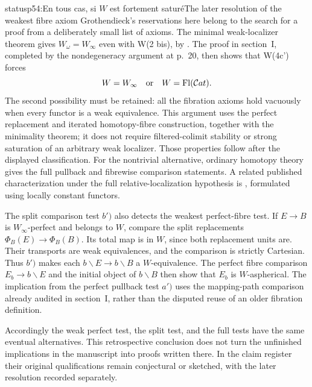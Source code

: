 \begin{dcomment}{status}{p54:En tous cas, si $W$ est fortement saturé}{The later resolution of the weakest fibre axiom}
Grothendieck's reservations here belong to the search for a proof from a deliberately small list of axioms. The minimal weak-localizer theorem gives $W_\omega=W_\infty$ even with W(2 bis), by \citet[Theorem~6.1.18]{Cisinski2006}. The proof in section~I, completed by the nondegeneracy argument at p.~20, then shows that W(4c') forces
\[
 W=W_\infty\quad\hbox{or}\quad W=\operatorname{Fl}(\mathcal{C}at).
\]
The second possibility must be retained: all the fibration axioms hold vacuously when every functor is a weak equivalence. This argument uses the perfect replacement and iterated homotopy-fibre construction, together with the minimality theorem; it does not require filtered-colimit stability or strong saturation of an arbitrary weak localizer. Those properties follow after the displayed classification. For the nontrivial alternative, ordinary homotopy theory gives the full pullback and fibrewise comparison statements. A related published characterization under the full relative-localization hypothesis is \citet[Theorem~6.4.22 and Remark~6.4.23]{Cisinski2006}, formulated using locally constant functors.

The split comparison test $b')$ also detects the weakest perfect-fibre test. If $E\to B$ is $W_\infty$-perfect and belongs to $W$, compare the split replacements $\Phi_B(E)\to\Phi_B(B)$. Its total map is in $W$, since both replacement units are. Their transports are weak equivalences, and the comparison is strictly Cartesian. Thus $b')$ makes each $b\backslash E\to b\backslash B$ a $W$-equivalence. The perfect fibre comparison $E_b\to b\backslash E$ and the initial object of $b\backslash B$ then show that $E_b$ is $W$-aspherical. The implication from the perfect pullback test $a')$ uses the mapping-path comparison already audited in section~I, rather than the disputed reuse of an older fibration definition.

Accordingly the weak perfect test, the split test, and the full tests have the same eventual alternatives. This retrospective conclusion does not turn the unfinished implications in the manuscript into proofs written there. In the claim register their original qualifications remain conjectural or sketched, with the later resolution recorded separately.
\end{dcomment}


